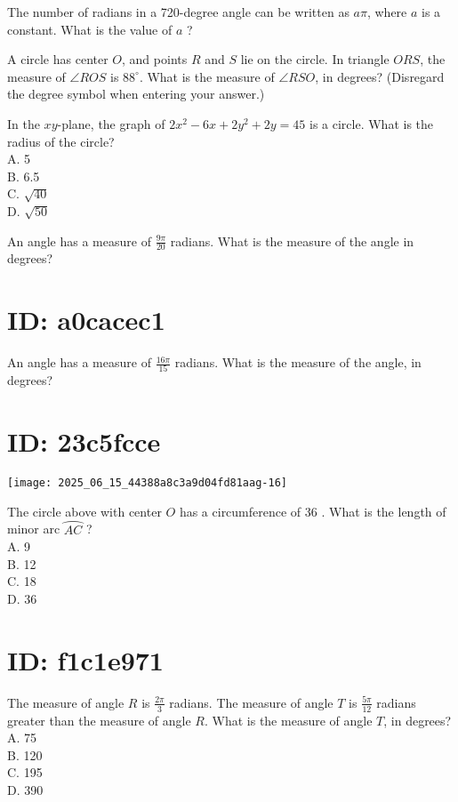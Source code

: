 



The number of radians in a 720-degree angle can be written as $a \pi$, where $a$ is a constant. What is the value of $a$ ?

A circle has center $O$, and points $R$ and $S$ lie on the circle. In triangle $O R S$, the measure of $\angle R O S$ is $88^{\circ}$. What is the measure of $\angle R S O$, in degrees? (Disregard the degree symbol when entering your answer.)

In the $x y$-plane, the graph of $2 x^{2}-6 x+2 y^{2}+2 y=45$ is a circle. What is the radius of the circle?\\
A. 5\\
B. 6.5\\
C. $\sqrt{40}$\\
D. $\sqrt{50}$

An angle has a measure of $\frac{9 \pi}{20}$ radians. What is the measure of the angle in degrees?

\section*{ID: a0cacec1}
An angle has a measure of $\frac{16 \pi}{15}$ radians. What is the measure of the angle, in degrees?

\section*{ID: 23c5fcce}
\begin{center}
\texttt{[image: 2025\_06\_15\_44388a8c3a9d04fd81aag-16]}
\end{center}

The circle above with center $O$ has a circumference of 36 . What is the length of minor arc $\wideparen{A C}$ ?\\
A. 9\\
B. 12\\
C. 18\\
D. 36

\section*{ID: f1c1e971}
The measure of angle $R$ is $\frac{2 \pi}{3}$ radians. The measure of angle $T$ is $\frac{5 \pi}{12}$ radians greater than the measure of angle $R$. What is the measure of angle $T$, in degrees?\\
A. 75\\
B. 120\\
C. 195\\
D. 390

